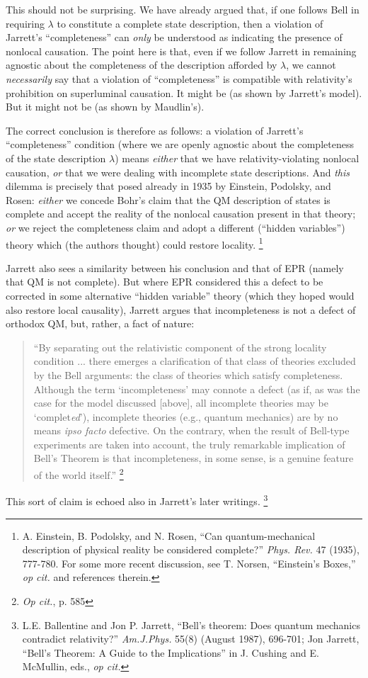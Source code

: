 \documentclass[12pt]{article}
\begin{document}
This should not be surprising.  We have already argued that, if one
follows Bell in requiring $\lambda$ to constitute a complete state
description, then a violation of Jarrett's ``completeness'' can \emph{only} be
understood as indicating the presence of nonlocal causation.  The
point here is that, even if we follow Jarrett in remaining agnostic
about the completeness of the description afforded by $\lambda$, we
cannot \emph{necessarily} say that a violation of ``completeness'' is
compatible with relativity's prohibition on superluminal causation.
It might be (as shown by Jarrett's model).  But it might not be (as
shown by Maudlin's).  

The correct conclusion is therefore as follows:  a violation of
Jarrett's ``completeness'' condition (where we are openly agnostic
about the completeness of the state description $\lambda$) means
\emph{either} that we have relativity-violating nonlocal
causation, \emph{or} that we were dealing with incomplete state 
descriptions.  And \emph{this} dilemma is precisely that posed already in
1935 by Einstein, Podolsky, and Rosen:  \emph{either} we concede Bohr's claim
that the QM description of states is complete and accept the reality
of the nonlocal causation present in that theory; \emph{or} we reject the
completeness claim and adopt a different (``hidden variables'') theory
which (the authors thought) could restore locality.
\footnote{A. Einstein, B. Podolsky, and N. Rosen, ``Can
  quantum-mechanical description of physical reality be considered 
  complete?'' \emph{Phys. Rev.} 47 (1935), 777-780.  For some more
  recent discussion, see T. Norsen, ``Einstein's Boxes,'' \emph{op
    cit.} and references therein.}


Jarrett also sees a similarity between his conclusion and that of EPR
(namely that QM is not complete).  But where EPR considered this a
defect to be corrected in some alternative ``hidden variable'' theory
(which they hoped would also restore local causality), Jarrett argues
that incompleteness is not a defect of orthodox QM, but, rather, a
fact of nature:  
\begin{quote}
``By separating out the relativistic component of the
strong locality condition ... there emerges a clarification of that
class of theories excluded by the Bell arguments:  the class of
theories which satisfy completeness.  Although the term
`incompleteness' may connote a defect (as if, as was the case for the
model discussed [above], all incomplete theories may be
`complet\emph{ed}'), incomplete theories (e.g., quantum mechanics) are
by no means \emph{ipso facto} defective.  On the contrary, when the
result of Bell-type experiments are taken into account, the truly
remarkable implication of Bell's Theorem is that incompleteness, in
some sense, is a genuine feature of the world itself.''
\footnote{\emph{Op cit.}, p. 585}
\end{quote}
This sort of claim is echoed also in Jarrett's later writings. 
\footnote{L.E. Ballentine and Jon P. Jarrett, 
``Bell's theorem:  Does quantum mechanics contradict relativity?'' 
\emph{Am.J.Phys.} 55(8) (August 1987), 696-701; Jon Jarrett, ``Bell's
Theorem:  A Guide to the Implications'' in J. Cushing and E. McMullin,
eds., \emph{op cit.}}
\end{document}
